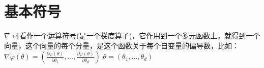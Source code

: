 \section{基本符号}
$\nabla$ 可看作一个运算符号(是一个梯度算子)，它作用到一个多元函数上，就得到一个向量，这个向量的每个分量，是这个函数关于每个自变量的偏导数，比如：
\\
$\nabla \varphi(\theta)=\left(\frac{\partial \varphi(\theta)}{\partial \theta_{1}}, \ldots, \frac{\partial \varphi(\theta)}{\partial \theta_{d}}\right)$
$\theta=\left(\theta_{1}, \ldots, \theta_{d}\right)$